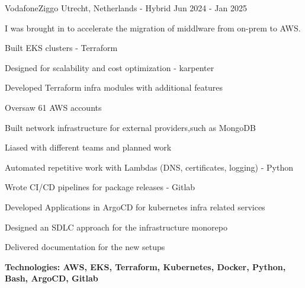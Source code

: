 


\begin{cventries}

{VodafoneZiggo}
{Utrecht, Netherlands - Hybrid}
{Jun 2024 - Jan 2025}
{
I was brought in to accelerate the migration of middlware from on-prem to AWS.
\newline \hfill
	\begin{cvitems}
		\item {Built EKS clusters - Terraform}
		\item {Designed for scalability and cost optimization - karpenter}
		\item {Developed Terraform infra modules with additional features}
		\item {Oversaw 61 AWS accounts}
		\item {Built network infrastructure for external providers,such as MongoDB}
		\item {Liased with different teams and planned work}
        \item {Automated repetitive work with Lambdas (DNS, certificates, logging) - Python}
		\item {Wrote CI/CD pipelines for package releases - Gitlab }
		\item {Developed Applications in ArgoCD for kubernetes infra related services}
		\item {Designed an SDLC approach for the infrastructure monorepo}
		\item {Delivered documentation for the new setups}
		\item {\bfseries{Technologies:} AWS, EKS, Terraform, Kubernetes, Docker, Python, Bash, ArgoCD, Gitlab}
	\end{cvitems}
}



\end{cventries}
